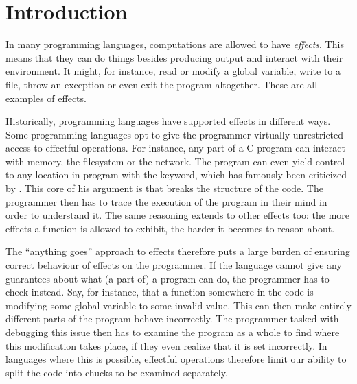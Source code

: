 \chapter{Introduction}\label{chap:introduction}



In many programming languages, computations are allowed to have \emph{effects}. This means that they can do things besides producing output and interact with their environment. It might, for instance, read or modify a global variable, write to a file, throw an exception or even exit the program altogether. These are all examples of effects.

Historically, programming languages have supported effects in different ways. Some programming languages opt to give the programmer virtually unrestricted access to effectful operations. For instance, any part of a C program can interact with memory, the filesystem or the network. The program can even yield control to any location in program with the  keyword, which has famously been criticized by \textcite{dijkstra_letters_1968}. This core of his argument is that  breaks the structure of the code. The programmer then has to trace the execution of the program in their mind in order to understand it. The same reasoning extends to other effects too: the more effects a function is allowed to exhibit, the harder it becomes to reason about.

The ``anything goes'' approach to effects therefore puts a large burden of ensuring correct behaviour of effects on the programmer. If the language cannot give any guarantees about what (a part of) a program can do, the programmer has to check instead. Say, for instance, that a function somewhere in the code is modifying some global variable to some invalid value. This can then make entirely different parts of the program behave incorrectly. The programmer tasked with debugging this issue then has to examine the program as a whole to find where this modification takes place, if they even realize that it is set incorrectly. In languages where this is possible, effectful operations therefore limit our ability to split the code into chucks to be examined separately.

